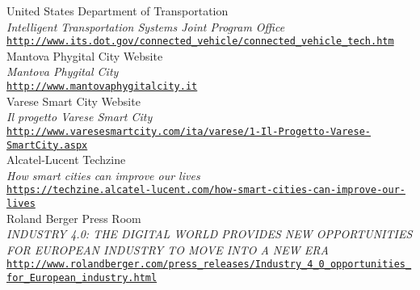 \begin{thebibliography}{}
 United States Department of Transportation\\
  \emph{Intelligent Transportation Systems Joint Program Office} \\
  \footnotesize \texttt{\url{http://www.its.dot.gov/connected_vehicle/connected_vehicle_tech.htm}} \\
  
 Mantova Phygital City Website\\
  \emph{Mantova Phygital City} \\
  \footnotesize \texttt{\url{http://www.mantovaphygitalcity.it}} \\
  
 Varese Smart City Website\\
  \emph{Il progetto Varese Smart City} \\
  \footnotesize \texttt{\url{http://www.varesesmartcity.com/ita/varese/1-Il-Progetto-Varese-SmartCity.aspx}} \\
  
 Alcatel-Lucent Techzine\\
  \emph{How smart cities can improve our lives} \\
  \footnotesize \texttt{\url{https://techzine.alcatel-lucent.com/how-smart-cities-can-improve-our-lives}} \\
  
 Roland Berger Press Room\\
  \emph{INDUSTRY 4.0: THE DIGITAL WORLD PROVIDES NEW OPPORTUNITIES FOR EUROPEAN INDUSTRY TO MOVE INTO A NEW ERA
} \\
  \footnotesize \texttt{\url{http://www.rolandberger.com/press_releases/Industry_4_0_opportunities_for_European_industry.html}} \\
  
\end{thebibliography}
